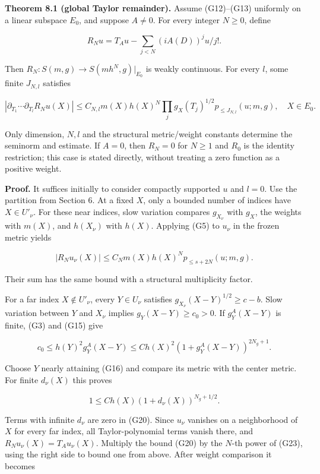\documentclass[
  11pt,
]{article}
\begin{document}
\textbf{Theorem 8.1 (global Taylor remainder).} Assume (G12)--(G13)
uniformly on a linear subspace \(E_0\), and suppose \(A\ne0\). For every
integer \(N\geq0\), define

\[
R_Nu=T_Au-\sum_{j<N}(iA(D))^ju/j!.
\]

Then \(R_N:S(m,g)\to S(mh^N,g)|_{E_0}\) is weakly continuous. For every
\(l\), some finite \(J_{N,l}\) satisfies

\[
|\partial_{T_1}\cdots\partial_{T_l}R_Nu(X)|
\leq C_{N,l}m(X)h(X)^N
\prod_jg_X(T_j)^{1/2}p_{\leq J_{N,l}}(u;m,g),\quad X\in E_0.
                                                               \tag{G22}
\]

Only dimension, \(N,l\) and the structural metric/weight constants
determine the seminorm and estimate. If \(A=0\), then \(R_N=0\) for
\(N\geq1\) and \(R_0\) is the identity restriction; this case is stated
directly, without treating a zero function as a positive weight.

\textbf{Proof.} It suffices initially to consider compactly supported
\(u\) and \(l=0\). Use the partition from Section 6. At a fixed \(X\),
only a bounded number of indices have \(X\in U'_\nu\). For these near
indices, slow variation compares \(g_{X_\nu}\) with \(g_X\), the weights
with \(m(X)\), and \(h(X_\nu)\) with \(h(X)\). Applying (G5) to
\(u_\nu\) in the frozen metric yields

\[
|R_Nu_\nu(X)|\leq C_Nm(X)h(X)^Np_{\leq s+2N}(u;m,g).
\]

Their sum has the same bound with a structural multiplicity factor.

For a far index \(X\notin U'_\nu\), every \(Y\in U_\nu\) satisfies
\(g_{X_\nu}(X-Y)^{1/2}\geq c-b\). Slow variation between \(Y\) and
\(X_\nu\) implies \(g_Y(X-Y)\geq c_0>0\). If \(g_Y^A(X-Y)\) is finite,
(G3) and (G15) give

\[
c_0\leq h(Y)^2g_Y^A(X-Y)
\leq C h(X)^2(1+g_Y^A(X-Y))^{2N_g+1}.
\]

Choose \(Y\) nearly attaining (G16) and compare its metric with the
center metric. For finite \(d_\nu(X)\) this proves

\[
1\leq C h(X)(1+d_\nu(X))^{N_g+1/2}.                        \tag{G23}
\]

Terms with infinite \(d_\nu\) are zero in (G20). Since \(u_\nu\)
vanishes on a neighborhood of \(X\) for every far index, all
Taylor-polynomial terms vanish there, and \(R_Nu_\nu(X)=T_Au_\nu(X)\).
Multiply the bound (G20) by the \(N\)-th power of (G23), using the right
side to bound one from above. After weight comparison it becomes
\end{document}
